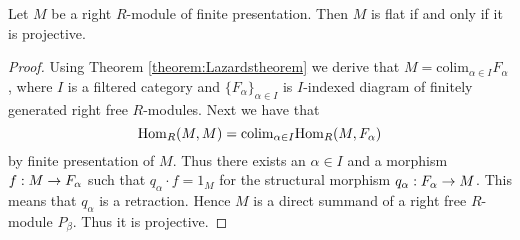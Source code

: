 \begin{corollary}
Let $M$ be a right $R$-module of finite presentation. Then $M$ is flat if and only if it is projective.
\end{corollary}
\begin{proof}
Using Theorem \ref{theorem:Lazardstheorem} we derive that $M=\mathrm{colim}_{\alpha \in I}F_{\alpha}$, where $I$ is a filtered category and $\{F_{\alpha}\}_{\alpha\in I}$ is $I$-indexed diagram of finitely generated right free $R$-modules. Next we have that
$$\mathrm{Hom}_R(M,M)=\mathrm{colim}_{\alpha\in I}\mathrm{Hom}_R(M,F_{\alpha})$$
by finite presentation of $M$. Thus there exists an $\alpha\in I$ and a morphism $f:M\rightarrow F_{\alpha}$ such that $q_{\alpha}\cdot f=1_M$ for the structural morphism $q_{\alpha}:F_{\alpha}\rightarrow M$. This means that $q_{\alpha}$ is a retraction. Hence $M$ is a direct summand of a right free $R$-module $P_{\beta}$. Thus it is projective.
\end{proof} 












































\small



